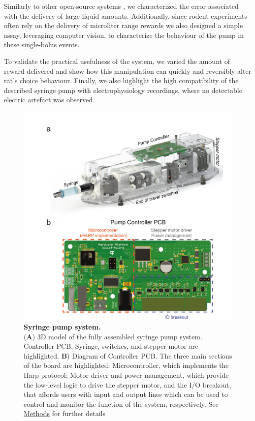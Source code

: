 Similarly to other open-source systems \cite{}, we characterized the error associated with the delivery of large liquid amounts. Additionally, since rodent experiments often rely on the delivery of microliter range rewards we also designed a simple assay, leveraging computer vision, to characterize the behaviour of the pump in these single-bolus events.

To validate the practical usefulness of the system, we varied the amount of reward delivered and show how this manipulation can quickly and reversibly alter rat's choice behaviour. Finally, we also highlight the high compatibility of the described syringe pump with electrophysiology recordings, where no detectable electric artefact was observed.


\begin{figure}
	\centering
	\includegraphics[width=1.0\linewidth]{Figures/Artboard 1.pdf}
	\caption{\textbf{Syringe pump system.}\\
		(\textbf{A}) 3D model of the fully assembled syringe pump system. Controller PCB, Syringe, switches, and stepper motor are highlighted.  \textbf{B}) Diagram of Controller PCB. The three main sections of the board are highlighted: Microcontroller, which implements the Harp protocol; Motor driver and power management, which provide the low-level logic to drive the stepper motor, and the I/O breakout, that affords users with input and output lines which can be used to control and monitor the function of the system, respectively. See \hyperref[s:methods]{Methods} for further details}
	\label{fig:PumpDrawing}
\end{figure}

